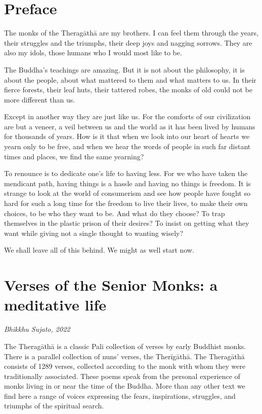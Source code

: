 \documentclass[12pt,openany]{book}%
\newcommand*{\scbyline}[1]{\begin{flushright}\textit{#1}\end{flushright}\bigskip}
\begin{document}
%
\chapter*{Preface}

The monks of the \textsanskrit{Theragāthā} are my brothers. I can feel them through the years, their struggles and the triumphs, their deep joys and nagging sorrows. They are also my idols, those humans who I would most like to be. 

The Buddha’s teachings are amazing. But it is not about the philosophy, it is about the people, about what mattered to them and what matters to us. In their fierce forests, their leaf huts, their tattered robes, the monks of old could not be more different than us.

Except in another way they are just like us. For the comforts of our civilization are but a veneer, a veil between us and the world as it has been lived by humans for thousands of years. How is it that when we look into our heart of hearts we yearn only to be free, and when we hear the words of people in such far distant times and places, we find the same yearning?

To renounce is to dedicate one’s life to having less. For we who have taken the mendicant path, having things is a hassle and having no things is freedom. It is strange to look at the world of consumerism and see how people have fought so hard for such a long time for the freedom to live their lives, to make their own choices, to be who they want to be. And what do they choose? To trap themselves in the plastic prison of their desires? To insist on getting what they want while giving not a single thought to wanting wisely? 

We shall leave all of this behind. We might as well start now.

%
\chapter*{Verses of the Senior Monks: a meditative life}

\scbyline{Bhikkhu Sujato, 2022}

The \textsanskrit{Theragāthā} is a classic Pali collection of verses by early Buddhist monks. There is a parallel collection of nuns’ verses, the \textsanskrit{Therīgāthā}. The \textsanskrit{Theragāthā} consists of 1289 verses, collected according to the monk with whom they were traditionally associated. These poems speak from the personal experience of monks living in or near the time of the Buddha. More than any other text we find here a range of voices expressing the fears, inspirations, struggles, and triumphs of the spiritual search.
\end{document}
